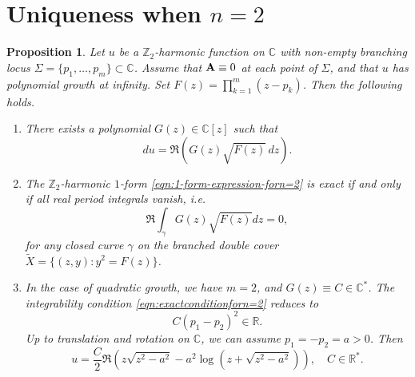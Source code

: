 \documentclass[11pt,a4paper]{article}
\numberwithin{equation}{section}%
\newtheorem{prop}[thm]{Proposition}
\theoremstyle{definition}
\newcommand{\ie}{\emph{i.e.} }
\newcommand{\R}{\mathbb{R}}
\newcommand{\C}{\mathbb{C}}
\newcommand{\Z}{\mathbb{Z}}
\begin{document}
\section{Uniqueness when $n=2$}
\label{sec:uniquen=2}
\begin{prop}
     Let $u$ be a $\Z_2$-harmonic function on $\C$ with non-empty branching locus
    $\Sigma=\{p_1,\ldots,p_m\}\subset \C$. Assume that ${\bf A}\equiv0$ at each point of $\Sigma$, and that $u$ has polynomial growth at infinity. Set
    $F(z)=\prod\limits_{k=1}^m(z-p_k)$. 
    Then the following holds. 
    \begin{enumerate}
        \item [\textnormal{(1)}] There exists a polynomial $G(z)\in \C[z]$ such that
    \begin{equation}
        \label{eqn:1-form-expression-forn=2}
        du=\Re\left(G(z)\sqrt{F(z)}\,dz\right).
    \end{equation}
        \item [\textnormal{(2)}] The $\Z_2$-harmonic $1$-form \eqref{eqn:1-form-expression-forn=2} is exact if and only if all real period integrals vanish, \ie
        \begin{equation}
            \label{eqn:exactconditionforn=2}
            \Re\int_{\gamma}G(z)\sqrt{F(z)}dz=0,
        \end{equation}
        for any closed curve $\gamma$ on the branched double cover $\widetilde X=\{(z,y):y^2=F(z)\}$.  
        \item [\textnormal{(3)}] In the case of quadratic growth, we have $m=2$, and $G(z)\equiv C\in \C^*$. The integrability condition \eqref{eqn:exactconditionforn=2} reduces to
        $$C(p_1-p_2)^2\in \R.$$
        Up to translation and rotation on $\C$, we can assume $p_1=-p_2=a>0$. Then
        \begin{equation}
            \label{eqn:answerforn=2}
            u=\frac{C}{2}\Re\left(z\sqrt{z^2-a^2}-a^2\log(z+\sqrt{z^2-a^2})\right),\quad C\in \R^*.
        \end{equation}
    \end{enumerate}
\end{prop}
\end{document}
